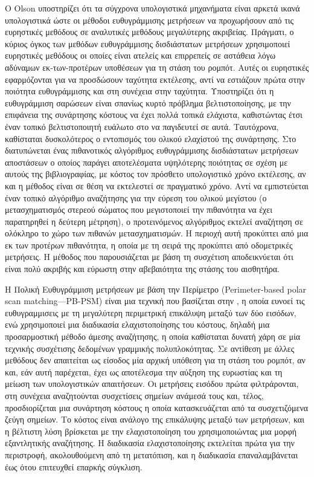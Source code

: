 Ο Olson \cite{Olson2009a} υποστηρίζει ότι τα σύγχρονα υπολογιστικά μηχανήματα
είναι αρκετά ικανά υπολογιστικά ώστε οι μέθοδοι ευθυγράμμισης μετρήσεων να
προχωρήσουν από τις ευρηστικές μεθόδους σε αναλυτικές μεθόδους μεγαλύτερης
ακριβείας. Πράγματι, ο κύριος όγκος των μεθόδων ευθυγράμμισης δισδιάστατων
μετρήσεων χρησιμοποιεί ευρηστικές μεθόδους οι οποίες είναι ατελείς και
επιρρεπείς σε αστάθεια λόγω αδύναμων εκ-των-προτέρων υποθέσεων για τη στάση του
ρομπότ. Αυτές οι ευρηστικές εφαρμόζονται για να προσδώσουν ταχύτητα εκτέλεσης,
αντί να εστιάζουν πρώτα στην ποιότητα ευθυγράμμισης και στη συνέχεια στην
ταχύτητα. Υποστηρίζει ότι η ευθυγράμμιση σαρώσεων είναι σπανίως κυρτό
πρόβλημα βελτιστοποίησης, με την επιφάνεια της συνάρτησης κόστους να έχει πολλά
τοπικά ελάχιστα, καθιστώντας έτσι έναν τοπικό βελτιστοποιητή ευάλωτο στο να
παγιδευτεί σε αυτά. Ταυτόχρονα, καθίσταται δυσκολότερος ο εντοπισμός του ολικού
ελαχίστού της συνάρτησης. Στο \cite{Olson2009a} διατυπώνεται ένας πιθανοτικός
αλγόριθμος ευθυγράμμισης δισδιάστατων μετρήσεων αποστάσεων ο οποίος παράγει
αποτελέσματα υψηλότερης ποιότητας σε σχέση με αυτούς της βιβλιογραφίας, με
κόστος τον πρόσθετο υπολογιστικό χρόνο εκτέλεσης, αν και η μέθοδος είναι σε
θέση να εκτελεστεί σε πραγματικό χρόνο. Αντί να εμπιστεύεται έναν τοπικό
αλγόριθμο αναζήτησης για την εύρεση του ολικού μεγίστου (ο μετασχηματισμός
στερεού σώματος που μεγιστοποιεί την πιθανότητα να έχει παρατηρηθεί η δεύτερη
μέτρηση), ο προτεινόμενος αλγόριθμος εκτελεί αναζήτηση σε ολόκληρο το χώρο των
πιθανών μετασχηματισμών. Η περιοχή αυτή προκύπτει από μια εκ των προτέρων
πιθανότητα, η οποία με τη σειρά της προκύπτει από οδομετρικές μετρήσεις. Η
μέθοδος που παρουσιάζεται με βάση τη συσχέτιση αποδεικνύεται ότι είναι πολύ
ακριβής και εύρωστη στην αβεβαιότητα της στάσης του αισθητήρα.

Η Πολική Ευθυγράμμιση μετρήσεων με βάση την Περίμετρο (Perimeter-based polar
scan matching---PB-PSM) \cite{Friedman2015} είναι μια τεχνική που βασίζεται
στην \cite{Diosi2005}, η οποία ευνοεί τις ευθυγραμμισεις με τη μεγαλύτερη
περιμετρική επικάλυψη μεταξύ των δύο εισόδων, ενώ χρησιμοποιεί μια διαδικασία
ελαχιστοποίησης του κόστους, δηλαδή μια προσαρμοστική μέθοδο άμεσης αναζήτησης,
η οποία καθίσταται δυνατή χάρη σε μία τεχνικής συσχέτισης δεδομένων γραμμικής
πολυπλοκότητας. Σε αντίθεση με άλλες μεθόδους δεν απαιτείται ως είσοδος μία
αρχική υπόθεση για τη στάση του ρομπότ, αν και, εάν αυτή παρέχεται, έχει ως
αποτέλεσμα την αύξηση της ευρωστίας και τη μείωση των υπολογιστικών απαιτήσεων.
Οι μετρήσεις εισόδου πρώτα φιλτράρονται, στη συνέχεια αναζητούνται συσχετίσεις
σημείων ανάμεσά τους και, τέλος, προσδιορίζεται μια συνάρτηση κόστους η οποία
κατασκευάζεται από τα συσχετιζόμενα ζεύγη σημείων. Το κόστος είναι ανάλογο της
επικάλυψης μεταξύ των μετρήσεων, και η βέλτιστη λύση βρίσκεται με την
ελαχιστοποίηση του χρησιμοποιώντας μια μορφή εξαντλητικής αναζήτησης. Η
διαδικασία ελαχιστοποίησης εκτελείται πρώτα για την περιστροφή, ακολουθούμενη
από τη μετατόπιση, και η διαδικασία επαναλαμβάνεται έως ότου επιτευχθεί επαρκής
σύγκλιση.

